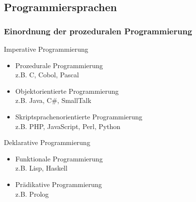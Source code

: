 \begin{frame}
\begin{columns}
\begin{column}{.5\textwidth}
	    \end{column}
	\end{columns}
\end{frame}

\subsection{Programmiersprachen}
\begin{frame}[fragile]
	\frametitle{Einordnung der prozeduralen Programmierung}
			Imperative Programmierung
			\small
			\begin{itemize}
			  \item Prozedurale Programmierung\\
			  z.B. C, Cobol, Pascal
			  \item Objektorientierte Programmierung\\
			  z.B. Java, C\#, SmallTalk
			  \item Skriptsprachenorientierte Programmierung\\
			  z.B. PHP, JavaScript, Perl, Python
			\end{itemize}
			\normalsize
	   		\vspace{0.3cm}
	   		Deklarative Programmierung
			\small
			\begin{itemize}
			  \item Funktionale Programmierung\\
			  z.B. Lisp, Haskell
			  \item Prädikative Programmierung\\
			  z.B. Prolog
			\end{itemize}
			\normalsize
\end{frame}

